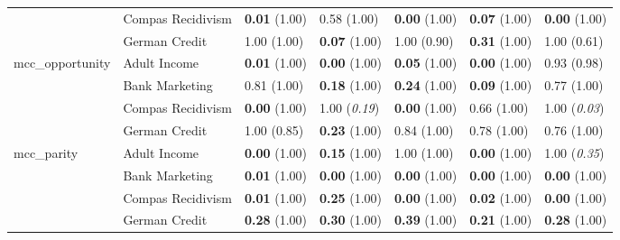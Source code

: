 \begin{tabular}{lllllll}
 & Compas Recidivism & \textbf{0.01} (1.00) & 0.58 (1.00) & \textbf{0.00} (1.00) & \textbf{0.07} (1.00) & \textbf{0.00} (1.00) \\
 & German Credit & 1.00 (1.00) & \textbf{0.07} (1.00) & 1.00 (0.90) & \textbf{0.31} (1.00) & 1.00 (0.61) \\
\cline{1-7}
\multirow[t]{4}{*}{mcc_opportunity} & Adult Income & \textbf{0.01} (1.00) & \textbf{0.00} (1.00) & \textbf{0.05} (1.00) & \textbf{0.00} (1.00) & 0.93 (0.98) \\
 & Bank Marketing & 0.81 (1.00) & \textbf{0.18} (1.00) & \textbf{0.24} (1.00) & \textbf{0.09} (1.00) & 0.77 (1.00) \\
 & Compas Recidivism & \textbf{0.00} (1.00) & 1.00 (\textit{0.19}) & \textbf{0.00} (1.00) & 0.66 (1.00) & 1.00 (\textit{0.03}) \\
 & German Credit & 1.00 (0.85) & \textbf{0.23} (1.00) & 0.84 (1.00) & 0.78 (1.00) & 0.76 (1.00) \\
\cline{1-7}
\multirow[t]{4}{*}{mcc_parity} & Adult Income & \textbf{0.00} (1.00) & \textbf{0.15} (1.00) & 1.00 (1.00) & \textbf{0.00} (1.00) & 1.00 (\textit{0.35}) \\
 & Bank Marketing & \textbf{0.01} (1.00) & \textbf{0.00} (1.00) & \textbf{0.00} (1.00) & \textbf{0.00} (1.00) & \textbf{0.00} (1.00) \\
 & Compas Recidivism & \textbf{0.01} (1.00) & \textbf{0.25} (1.00) & \textbf{0.00} (1.00) & \textbf{0.02} (1.00) & \textbf{0.00} (1.00) \\
 & German Credit & \textbf{0.28} (1.00) & \textbf{0.30} (1.00) & \textbf{0.39} (1.00) & \textbf{0.21} (1.00) & \textbf{0.28} (1.00) \\
\cline{1-7}
\bottomrule
\end{tabular}
